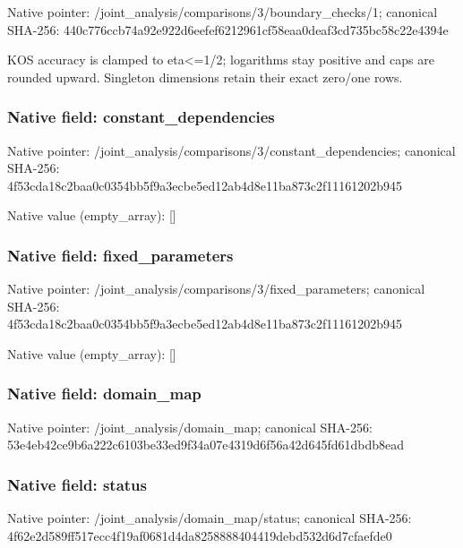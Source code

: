 \documentclass[10pt,a4paper]{article}
\begin{document}
Native pointer: /joint\_analysis/comparis\allowbreak{}ons/3/boundary\_checks/1; canonical SHA-256: 440c776ccb74a92e922d6eef\allowbreak{}ef6212961cf58eaa0deaf3cd\allowbreak{}735bc58c22e4394e


KOS accuracy is clamped to eta<=1/2; logarithms stay positive and caps are rounded upward. Singleton dimensions retain their exact zero/one rows.


\subsubsection{Native field: constant\_dependencies}


Native pointer: /joint\_analysis/comparis\allowbreak{}ons/3/constant\_dependenc\allowbreak{}ies; canonical SHA-256: 4f53cda18c2baa0c0354bb5f\allowbreak{}9a3ecbe5ed12ab4d8e11ba87\allowbreak{}3c2f11161202b945



Native value (empty\_array): []



\subsubsection{Native field: fixed\_parameters}


Native pointer: /joint\_analysis/comparis\allowbreak{}ons/3/fixed\_parameters; canonical SHA-256: 4f53cda18c2baa0c0354bb5f\allowbreak{}9a3ecbe5ed12ab4d8e11ba87\allowbreak{}3c2f11161202b945



Native value (empty\_array): []



\subsubsection{Native field: domain\_map}


Native pointer: /joint\_analysis/domain\_map; canonical SHA-256: 53e4eb42ce9b6a222c6103be\allowbreak{}33ed9f34a07e4319d6f56a42\allowbreak{}d645fd61dbdb8ead



\subsubsection{Native field: status}


Native pointer: /joint\_analysis/domain\_map/status; canonical SHA-256: 4f62e2d589ff517ecc4f19af\allowbreak{}0681d4da8258888404419deb\allowbreak{}d532d6d7cfaefde0
\end{document}

